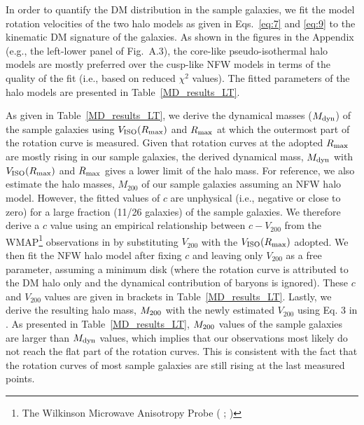 \documentclass[natbib209]{emulateapj}
\begin{document}
In order to quantify the DM distribution in the sample galaxies, we fit
the model rotation velocities of the two halo models as given in Eqs.~\ref{eq:7}
and \ref{eq:9} to the kinematic DM signature of the galaxies. As shown in the figures in
the Appendix (e.g., the left-lower panel of Fig.~A.3), the core-like
pseudo-isothermal halo models are mostly preferred over the cusp-like NFW models
in terms of the quality of the fit (i.e., based on reduced $\chi^{2}$ values).
The fitted parameters of the halo models are presented in
Table~\ref{MD_results_LT}.


As given in Table~\ref{MD_results_LT},
we derive the dynamical masses ($M_{\rm dyn}$) of the sample galaxies using
$V_{\rm ISO}(R_{\rm max})$ and $R_{\rm max}$ at which the outermost part of the
rotation curve is measured. Given that rotation curves at the adopted
$R_{\rm max}$ are mostly rising in our sample galaxies, the derived dynamical
mass, $M_{\rm dyn}$ with $V_{\rm ISO}(R_{\rm max})$ and $R_{\rm max}$ gives a lower limit of
the halo mass. For reference, we also estimate the halo masses, $M_{200}$ of our
sample galaxies assuming an NFW halo model. However, the fitted values of $c$
are unphysical (i.e., negative or close to zero) for a large fraction (11/26
galaxies) of the sample galaxies. We therefore derive a $c$ value using an empirical relationship
between $c - V_{200}$ from the WMAP\footnote{The Wilkinson Microwave Anisotropy Probe
(\citeauthor{Spergel_2003} \citeyear{Spergel_2003};
\citeauthor{Spergel_2007} \citeyear{Spergel_2007})} observations in \cite{McGaugh_2007} by
substituting $V_{200}$ with the $V_{\rm ISO}(R_{\rm max})$ adopted. We then fit the NFW halo
model after fixing $c$ and leaving only $V_{200}$ as a free parameter, assuming a minimum
disk (where the rotation curve is attributed to the DM halo only and
the dynamical contribution of baryons is ignored). These $c$ and
$V_{200}$ values are given in brackets in Table~\ref{MD_results_LT}. Lastly, we derive the
resulting halo mass, $M_{\rm 200}$ with the newly estimated $V_{200}$ using 
Eq. 3 in \cite{Oh_2011b}. As presented in Table~\ref{MD_results_LT}, $M_{\rm 200}$
values of the sample galaxies are larger than $M_{\rm dyn}$ values, which
implies that our observations most likely do not reach the flat part of the
rotation curves. This is consistent with the fact that the rotation curves
of most sample galaxies are still rising at the last measured points.
\end{document}
